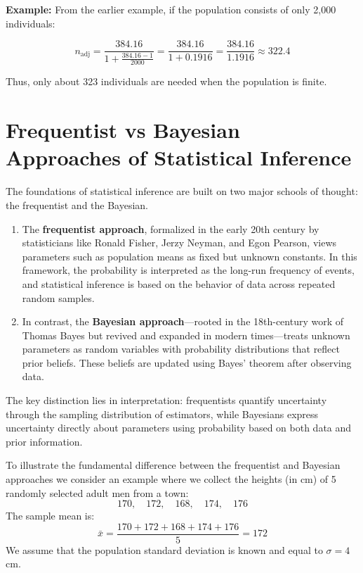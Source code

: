 \documentclass[twoside]{book}
\begin{document}
\textbf{Example:} From the earlier example, if the population consists of only 2,000 individuals:

\[
n_{\text{adj}} = \frac{384.16}{1 + \frac{384.16 - 1}{2000}} = \frac{384.16}{1 + 0.1916} = \frac{384.16}{1.1916} \approx 322.4
\]

Thus, only about 323 individuals are needed when the population is finite.

\section{Frequentist vs Bayesian Approaches of Statistical Inference}

The foundations of statistical inference are built on two major schools of thought: the frequentist and the Bayesian.

\begin{enumerate}
\item The \textbf{frequentist approach}, formalized in the early 20th century by statisticians like Ronald Fisher, Jerzy Neyman, and Egon Pearson, views parameters such as population means as fixed but unknown constants. In this framework, the probability is interpreted as the long-run frequency of events, and statistical inference is based on the behavior of data across repeated random samples.

\item In contrast, the \textbf{Bayesian approach}—rooted in the 18th-century work of Thomas Bayes but revived and expanded in modern times—treats unknown parameters as random variables with probability distributions that reflect prior beliefs. These beliefs are updated using Bayes’ theorem after observing data.
\end{enumerate}

The key distinction lies in interpretation: frequentists quantify uncertainty through the sampling distribution of estimators, while Bayesians express uncertainty directly about parameters using probability based on both data and prior information.

To illustrate the fundamental difference between the frequentist and Bayesian approaches we consider an example where we collect the heights (in cm) of 5 randomly selected adult men from a town:
\[
170,\quad 172,\quad 168,\quad 174,\quad 176
\]
The sample mean is:
\[
\bar{x} = \frac{170 + 172 + 168 + 174 + 176}{5} = 172
\]
We assume that the population standard deviation is known and equal to $\sigma = 4$ cm.

\vspace{1em}
\end{document}
